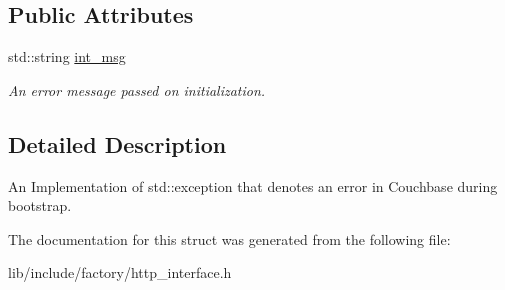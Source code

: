 \subsection*{Public Attributes}
\begin{DoxyCompactItemize}
\item 
\hypertarget{structHttpRequestException_a52a64d4648b543b81050bec3fb039e5f}{std\-::string \hyperlink{structHttpRequestException_a52a64d4648b543b81050bec3fb039e5f}{int\-\_\-msg}}\label{structHttpRequestException_a52a64d4648b543b81050bec3fb039e5f}

\begin{DoxyCompactList}\small\item\em An error message passed on initialization. \end{DoxyCompactList}\end{DoxyCompactItemize}


\subsection{Detailed Description}
An Implementation of std\-::exception that denotes an error in Couchbase during bootstrap. 

The documentation for this struct was generated from the following file\-:\begin{DoxyCompactItemize}
\item 
lib/include/factory/http\-\_\-interface.\-h\end{DoxyCompactItemize}
